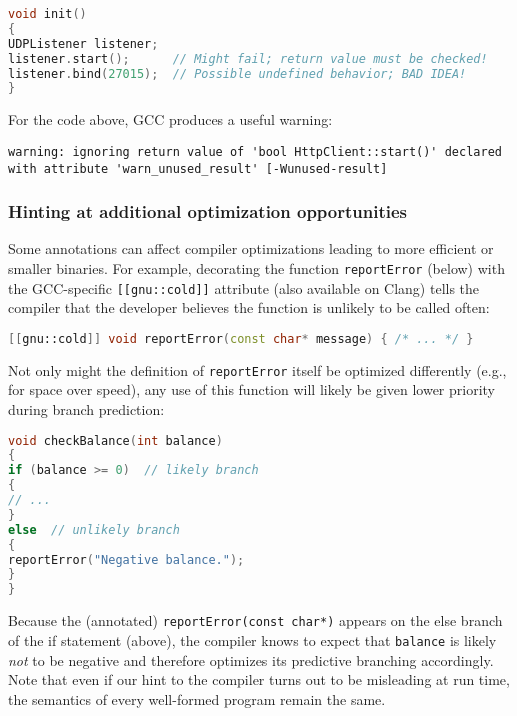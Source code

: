 \begin{lstlisting}[language=C++]
void init()
{
UDPListener listener;
listener.start();      // Might fail; return value must be checked!
listener.bind(27015);  // Possible undefined behavior; BAD IDEA!
}
\end{lstlisting}

\noindent For the code above, GCC produces a useful warning:

\begin{lstlisting}[style=plain]
warning: ignoring return value of 'bool HttpClient::start()' declared
with attribute 'warn_unused_result' [-Wunused-result]
\end{lstlisting}


\subsubsection[Hinting at additional optimization opportunities]{Hinting at additional optimization opportunities}\label{hinting-at-additional-optimization-opportunities}

Some annotations can affect compiler optimizations leading to more
efficient or smaller binaries. For example, decorating the function
\texttt{reportError} (below) with the GCC-specific
\texttt{[[gnu::cold]]} attribute (also available on Clang) tells the
compiler that the developer believes the function is unlikely to be
called often:

\begin{lstlisting}[language=C++]
[[gnu::cold]] void reportError(const char* message) { /* ... */ }
\end{lstlisting}

\noindent Not only might the definition of \texttt{reportError} itself be
optimized differently (e.g., for space over speed), any use of this
function will likely be given lower priority during branch \mbox{prediction}:

\begin{lstlisting}[language=C++]
void checkBalance(int balance)
{
if (balance >= 0)  // likely branch
{
// ...
}
else  // unlikely branch
{
reportError("Negative balance.");
}
}
\end{lstlisting}
\pagebreak%

\noindent Because the (annotated) \texttt{reportError(const}~\texttt{char*)}
appears on the else branch of the if statement (above), the compiler
knows to expect that \texttt{balance} is likely \emph{not} to be
negative and therefore optimizes its predictive branching accordingly.
Note that even if our hint to the compiler turns out to be misleading at
run time, the semantics of every well-formed program remain the same.

